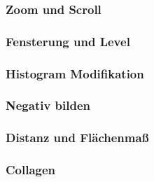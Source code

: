 \subsubsection{Zoom und Scroll}
\subsubsection{Fensterung und Level}
\subsubsection{Histogram Modifikation}
\subsubsection{Negativ bilden}
\subsubsection{Distanz und Flächenmaß}
\subsubsection{Collagen}

